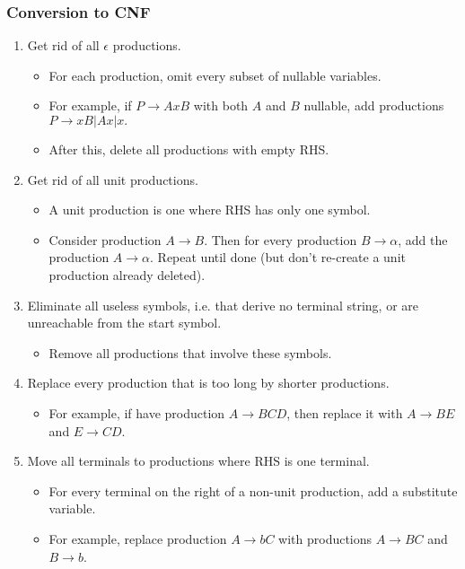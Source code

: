 \subsubsection{Conversion to CNF}
\begin{enumerate}
    \item Get rid of all $\epsilon$ productions.
\begin{itemize}
    \item For each production, omit every subset of nullable variables.
    \item For example, if $P \rightarrow Ax B$ with both $A$ and $B$ nullable, add productions $P \rightarrow xB |Ax |x.$
\item After this, delete all productions with empty RHS.
\end{itemize}
\item Get rid of all unit productions.
\begin{itemize}
    \item A unit production is one where RHS has only one symbol.
    \item Consider production $A \rightarrow B$. Then for every production $B\rightarrow \alpha$, add the production $A \rightarrow \alpha$. Repeat until done (but don’t re-create a unit production already deleted).
\end{itemize}
\item Eliminate all useless symbols, i.e. that derive no terminal string, or are unreachable from the start symbol.
\begin{itemize}
    \item Remove all productions that involve these symbols.
\end{itemize}
\item Replace every production that is too long by shorter productions.
\begin{itemize}
    \item For example, if have production $A\rightarrow BCD$, then replace it with $A\rightarrow BE$ and $E \rightarrow CD$.
\end{itemize}
\item Move all terminals to productions where RHS is one terminal.
\begin{itemize}
    \item For every terminal on the right of a non-unit production, add a substitute variable.
\item For example, replace production $A \rightarrow bC$ with
productions $A\rightarrow BC$ and $B \rightarrow b$.
\end{itemize}
\end{enumerate}
